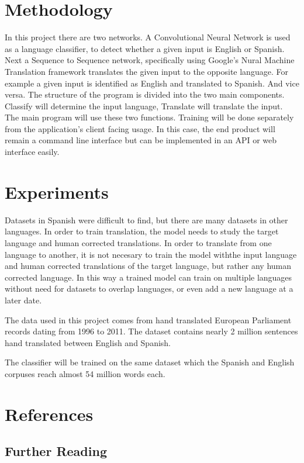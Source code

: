 \documentclass[10pt,a4paper]{report}
\begin{document}
\section{Methodology}
In this project there are two networks. 
A Convolutional Neural Network is used as a language classifier, to detect whether a given input is English or Spanish. 
Next a Sequence to Sequence network, specifically using Google's Nural Machine Translation framework translates the given input to the opposite language.
For example a given input is identified as English and translated to Spanish. And vice versa.
The structure of the program is divided into the two main components. Classify will determine the input language, Translate will translate the input. The main program will use these two functions. Training will be done separately from the application's client facing usage. In this case, the end product will remain a command line interface but can be implemented in an API or web interface easily.

\section{Experiments}
Datasets in Spanish were difficult to find, but there are many datasets in other languages. In order to train translation, the model needs to study the target language and human corrected translations. In order to translate from one language to another, it is not necesary to train the model withthe input language and human corrected translations of the target language, but rather any human corrected language. In this way a trained model can train on multiple languages without need for datasets to overlap languages, or even add a new language at a later date.

The data used in this project comes from hand translated European Parliament records dating from 1996 to 2011. The dataset contains nearly 2 million sentences hand translated between English and Spanish.

The classifier will be trained on the same dataset which the Spanish and English corpuses reach almost 54 million words each.

\clearpage
\section{References}

\subsection{Further Reading}
\end{document}
